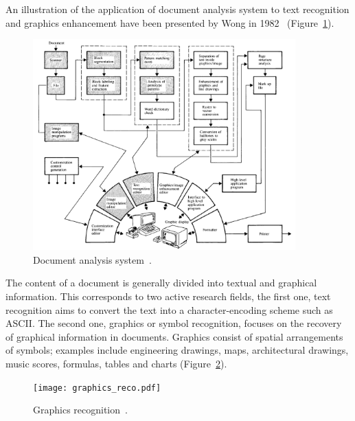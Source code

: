 An illustration of the application of document analysis system to text recognition and graphics enhancement have been presented by Wong in 1982~\cite{wong1982document} (Figure~\ref{fig:sota:document_analysis_system}).


    \begin{figure}[ht]%
      \centering
      \includegraphics[width=0.9\textwidth]{document_analysis_system.png}
    \caption[Document analysis system]{Document analysis system~\cite{wong1982document}.}
    \label{fig:sota:document_analysis_system}
    \end{figure}

The content of a document is generally divided into textual and graphical information.
This corresponds to two active research fields, the first one, text recognition aims to convert the text into a character-encoding scheme such as ASCII.
The second one, graphics or symbol recognition, focuses on the recovery of graphical information in documents.
Graphics consist of spatial arrangements of symbols; examples include engineering drawings, maps, architectural drawings, music scores, formulas, tables and charts (Figure~\ref{fig:sota:graphics_reco}).

    \begin{figure}[ht]%
      \centering
      \texttt{[image: graphics\_reco.pdf]}
    \caption[Graphics recognition]{Graphics recognition~\cite{wong1982document}.}
    \label{fig:sota:graphics_reco}
    \end{figure}

